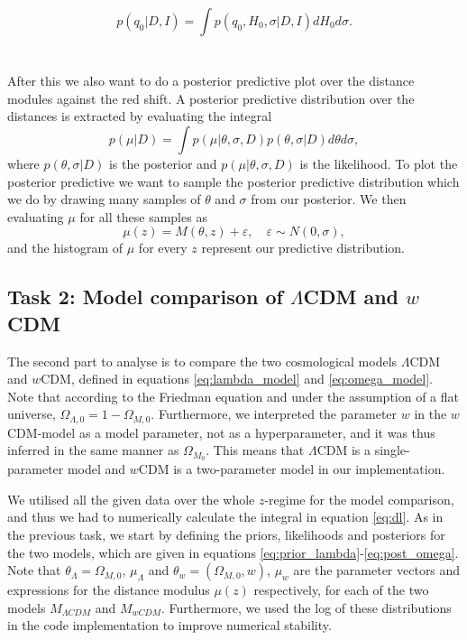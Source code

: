 \documentclass[11pt,a4paper]{article}
\begin{document}
\begin{equation*}
    p(q_0|D,I) = \int p(q_0,H_0, \sigma|D,I) d H_0 d\sigma.
\end{equation*}
\newline
\\\\
After this we also want to do a posterior predictive plot over the distance modules against the red shift. A posterior predictive distribution over the distances is extracted by evaluating the integral 
\begin{equation*}
    p(\mu| D) = \int p(\mu|\theta, \sigma, D) p(\theta, \sigma| D) d\theta d\sigma,
\end{equation*}
where $ p(\theta, \sigma| D)$ is the posterior and $p(\mu|\theta, \sigma, D)$ is the likelihood. To plot the posterior predictive we want to sample the posterior predictive distribution which we do by drawing many samples of $\theta$ and $\sigma$ from our posterior.  We then evaluating $\mu$ for all these samples as 
\begin{equation*}
    \mu(z) = M(\theta, z) + \varepsilon, \quad \varepsilon \sim N(0, \sigma),
\end{equation*}
and the histogram of $\mu$ for every $z$ represent our predictive distribution. 



\subsection[Task 2]{Task 2: Model comparison of $\Lambda$CDM and $w$CDM}

The second part to analyse is to compare the two cosmological models $\Lambda$CDM and $w$CDM, defined in equations \eqref{eq:lambda_model} and \eqref{eq:omega_model}. Note that according to the Friedman equation and under the assumption of a flat universe, $\Omega_{\Lambda,0}=1-\Omega_{M,0}$. Furthermore, we interpreted the parameter $w$ in the $w$CDM-model as a model parameter, not as a hyperparameter, and it was thus inferred in the same manner as $\Omega_{M_0}$. This means that $\Lambda$CDM is a single-parameter model and $w$CDM is a two-parameter model in our implementation.

We utilised all the given data over the whole $z$-regime for the model comparison, and thus we had to numerically calculate the integral in equation \eqref{eq:dl}. As in the previous task, we start by defining the priors, likelihoods and posteriors for the two models, which are given in equations \eqref{eq:prior_lambda}-\eqref{eq:post_omega}. Note that $\theta_\Lambda=\Omega_{M,0}$, $\mu_{\Lambda}$ and $\theta_w=(\Omega_{M,0}, w)$, $\mu_{w}$ are the parameter vectors and expressions for the distance modulus $\mu(z)$ respectively, for each of the two models $M_{\Lambda CDM}$ and $M_{wCDM}$. Furthermore, we used the log of these distributions in the code implementation to improve numerical stability. 
\end{document}
